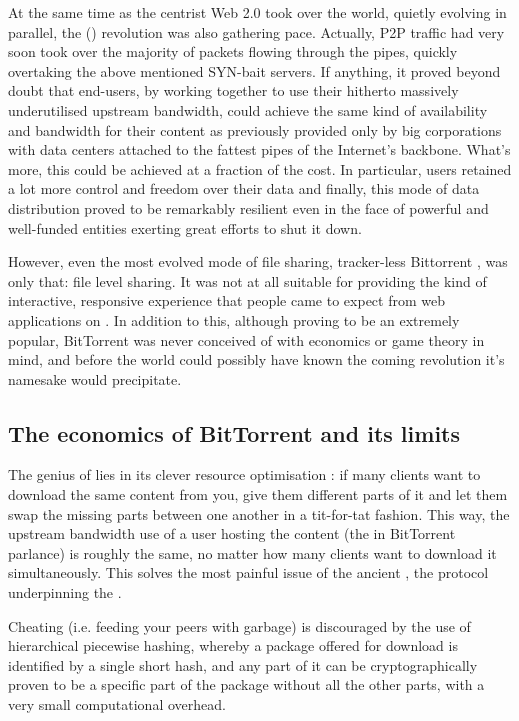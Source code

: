 At the same time as the centrist Web 2.0 took over the world, quietly evolving in parallel, the  () revolution was also gathering pace. Actually, P2P traffic had very soon took over the majority of packets flowing through the pipes, quickly overtaking the above mentioned SYN-bait servers. If anything, it proved beyond doubt that end-users, by working together to use their hitherto massively underutilised upstream bandwidth, could achieve the same kind of availability and bandwidth for their content as previously provided only by big corporations with data centers attached to the fattest pipes of the Internet's backbone. What's more, this could be achieved at a fraction of the cost. In particular, users retained a lot more control and freedom over their data and finally, this mode of data distribution proved to be remarkably resilient even in the face of powerful and well-funded entities exerting great efforts to shut it down.

However, even the most evolved mode of  file sharing, tracker-less Bittorrent \cite{pouwelse2005bittorrent}, was only that: file level sharing. It was not at all suitable for providing the kind of interactive, responsive experience that people came to expect from web applications on . In addition to this, although proving to be an extremely popular, BitTorrent was never conceived of with economics or game theory in mind, and before the world could possibly have known the coming revolution it's namesake would precipitate.

\subsection{The economics of BitTorrent and its limits \statusgreen}

The genius of  lies in its clever resource optimisation \cite{cohen2003incentives}: if many clients want to download the same content from you, give them different parts of it and let them swap the missing parts between one another in a tit-for-tat fashion. This way, the upstream bandwidth use of a user hosting the content (the  in BitTorrent parlance) is roughly the same, no matter how many clients want to download it simultaneously. This solves the most painful issue of the ancient , the protocol underpinning the .

Cheating (i.e. feeding your peers with garbage) is discouraged by the use of hierarchical piecewise hashing, whereby a package offered for download is identified by a single short hash, and any part of it can be cryptographically proven to be a specific part of the package without all the other parts, with a very small computational overhead. 

